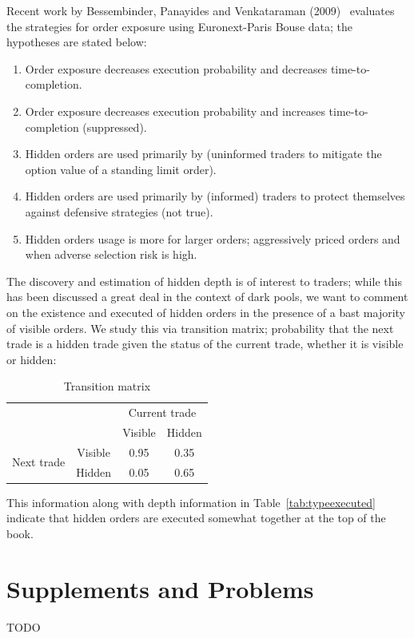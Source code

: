 Recent work by Bessembinder, Panayides and Venkataraman (2009)~\cite{bessenbinder} evaluates the strategies for order exposure using Euronext-Paris Bouse data; the hypotheses are stated below:
\begin{enumerate}[--]
\item Order exposure decreases execution probability and decreases time-to-completion.
\item Order exposure decreases execution probability and increases time-to-completion (suppressed).
\item Hidden orders are used primarily by (uninformed traders to mitigate the option value of a standing limit order).
\item Hidden orders are used primarily by (informed) traders to protect themselves against defensive strategies (not true).
\item Hidden orders usage is more for larger orders; aggressively priced orders and when adverse selection risk is high. 
\end{enumerate}


The discovery and estimation of hidden depth is of interest to traders; while this has been discussed a great deal in the context of dark pools, we want to comment on the existence and executed of hidden orders in the presence of a bast majority of visible orders. We study this via transition matrix; probability that the next trade is a hidden trade given the status of the current trade, whether it is visible or hidden: 
	\begin{table}[!ht]
	\centering
	\caption{Transition matrix \label{tab:transition matrix}}
	\begin{tabular}{cc|cc}
	 &  & \multicolumn{2}{c}{Current trade} \\
	 &  & Visible & Hidden \\ \hline
	\multirow{2}{*}{Next trade} & Visible & 0.95 & 0.35 \\
	 & Hidden & 0.05 & 0.65
	\end{tabular}
	\end{table}
This information along with depth information in Table~\ref{tab:typeexecuted} indicate that hidden orders are executed somewhat together at the top of the book. 
























\section{Supplements and Problems} 
TODO
